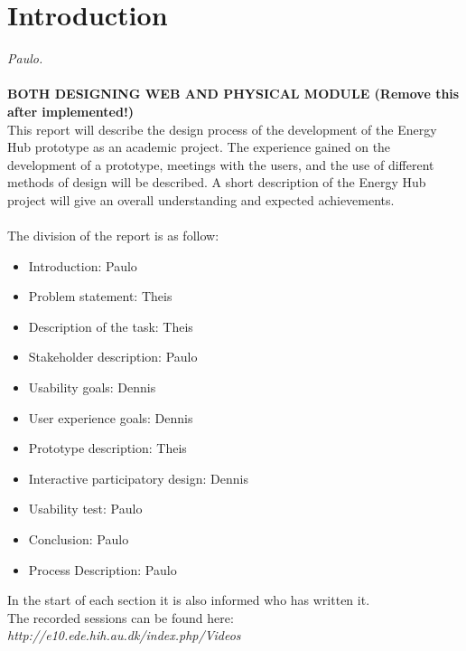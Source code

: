 \chapter{Introduction}\textit{Paulo.}\\
\\ \textbf{BOTH DESIGNING WEB AND PHYSICAL MODULE (Remove this after implemented!)}
\\This report will describe the design process of the development of the Energy Hub prototype as an academic project. The experience gained on the development of a prototype, meetings with the users, and the use of different methods of design will be described. A short description of the Energy Hub project will give an overall understanding and expected achievements.
\\ \\ The division of the report is as follow: 
\begin{itemize}
	\item Introduction: Paulo
	\item Problem statement: Theis
	\item Description of the task: Theis
	\item Stakeholder description: Paulo
	\item Usability goals: Dennis
	\item User experience goals: Dennis
	\item Prototype description: Theis
	\item Interactive participatory design: Dennis
	\item Usability test: Paulo
	\item Conclusion: Paulo
	\item Process Description: Paulo
\end{itemize}
In the start of each section it is also informed who has written it.
\\
The recorded sessions can be found here: \textit{http://e10.ede.hih.au.dk/index.php/Videos}
